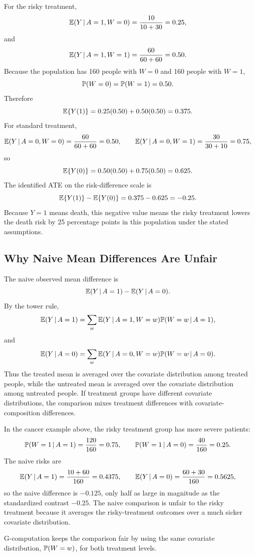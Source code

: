 For the risky treatment,
\[
\mathbb{E}(Y\,\vert\, A=1,W=0)=\frac{10}{10+30}=0.25,
\]
and
\[
\mathbb{E}(Y\,\vert\, A=1,W=1)=\frac{60}{60+60}=0.50.
\]
Because the population has 160 people with $W=0$ and 160 people with $W=1$,
\[
\mathbb{P}(W=0)=\mathbb{P}(W=1)=0.50.
\]
Therefore
\[
\mathbb{E}\{Y(1)\}
=0.25(0.50)+0.50(0.50)=0.375.
\]
For standard treatment,
\[
\mathbb{E}(Y\,\vert\, A=0,W=0)=\frac{60}{60+60}=0.50,
\qquad
\mathbb{E}(Y\,\vert\, A=0,W=1)=\frac{30}{30+10}=0.75,
\]
so
\[
\mathbb{E}\{Y(0)\}
=0.50(0.50)+0.75(0.50)=0.625.
\]
The identified ATE on the risk-difference scale is
\[
\mathbb{E}\{Y(1)\}-\mathbb{E}\{Y(0)\}=0.375-0.625=-0.25.
\]
Because $Y=1$ means death, this negative value means the risky treatment lowers
the death risk by 25 percentage points in this population under the stated
assumptions.

\subsection{Why Naive Mean Differences Are Unfair}

The naive observed mean difference is
\[
\mathbb{E}(Y\,\vert\, A=1)-\mathbb{E}(Y\,\vert\, A=0).
\]
By the tower rule,
\[
\mathbb{E}(Y\,\vert\, A=1)
=
\sum_w \mathbb{E}(Y\,\vert\, A=1,W=w)\mathbb{P}(W=w\,\vert\, A=1),
\]
and
\[
\mathbb{E}(Y\,\vert\, A=0)
=
\sum_w \mathbb{E}(Y\,\vert\, A=0,W=w)\mathbb{P}(W=w\,\vert\, A=0).
\]
Thus the treated mean is averaged over the covariate distribution among treated people, while the untreated mean is averaged over the covariate distribution among untreated people. If treatment groups have different covariate distributions, the comparison mixes treatment differences with covariate-composition differences.

In the cancer example above, the risky treatment group has more severe patients:
\[
\mathbb{P}(W=1\,\vert\, A=1)=\frac{120}{160}=0.75,
\qquad
\mathbb{P}(W=1\,\vert\, A=0)=\frac{40}{160}=0.25.
\]
The naive risks are
\[
\mathbb{E}(Y\,\vert\, A=1)=\frac{10+60}{160}=0.4375,
\qquad
\mathbb{E}(Y\,\vert\, A=0)=\frac{60+30}{160}=0.5625,
\]
so the naive difference is $-0.125$, only half as large in magnitude as the
standardized contrast $-0.25$. The naive comparison is unfair to the risky
treatment because it averages the risky-treatment outcomes over a much sicker
covariate distribution.

\begin{keyidea}
G-computation keeps the comparison fair by using the same covariate distribution, $\mathbb{P}(W=w)$, for both treatment levels.
\end{keyidea}
